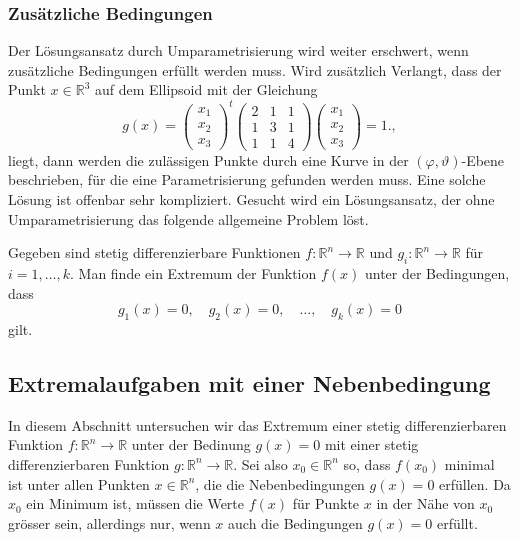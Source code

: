 %
%
\subsubsection{Zusätzliche Bedingungen}
Der Lösungsansatz durch Umparametrisierung wird weiter erschwert,
wenn zusätzliche Bedingungen erfüllt werden muss.
Wird zusätzlich Verlangt, dass der Punkt $x\in\mathbb{R}^3$ auf
dem Ellipsoid mit der Gleichung
\begin{equation}
g(x)
=
\begin{pmatrix}
x_1\\x_2\\x_3
\end{pmatrix}^t
\begin{pmatrix}
2&1&1\\
1&3&1\\
1&1&4
\end{pmatrix}
\begin{pmatrix}
x_1\\x_2\\x_3
\end{pmatrix}
=
1.
\label{buch:fuvar:nebenbedingungen:eqn:beispielg},
\end{equation}
liegt, dann werden die zulässigen Punkte durch eine Kurve in der
$(\varphi,\vartheta)$-Ebene beschrieben, für die eine Parametrisierung
gefunden werden muss.
Eine solche Lösung ist offenbar sehr kompliziert.
Gesucht wird ein Lösungsansatz, der ohne Umparametrisierung das folgende
allgemeine Problem löst.

\begin{aufgabe}
\label{buch:fuvar:nebenbedingungen:aufgabe:grund}
Gegeben sind stetig differenzierbare Funktionen
$f\colon\mathbb{R}^n\to\mathbb{R}$ und
$g_i\colon\mathbb{R}^n\to\mathbb{R}$ für $i=1,\dots,k$.
Man finde ein Extremum der Funktion $f(x)$ unter der Bedingungen,
dass
\[
g_1(x) = 0,\quad g_2(x)=0,\quad\dots,\quad g_k(x)=0
\]
gilt.
\end{aufgabe}

%
%
\subsection{Extremalaufgaben mit einer Nebenbedingung}
In diesem Abschnitt untersuchen wir das Extremum einer stetig
differenzierbaren Funktion $f\colon\mathbb{R}^n\to\mathbb{R}$
unter der Bedinung $g(x)=0$ mit einer stetig differenzierbaren
Funktion $g\colon\mathbb{R}^n\to\mathbb{R}$.
Sei also $x_0\in\mathbb{R}^n$ so, dass $f(x_0)$ minimal ist unter
allen Punkten $x\in \mathbb{R}^n$, die die Nebenbedingungen $g(x)=0$
erfüllen.
Da $x_0$ ein Minimum ist, müssen die Werte $f(x)$ für Punkte $x$
in der Nähe von $x_0$ grösser sein, allerdings nur, wenn $x$ auch
die Bedingungen $g(x)=0$ erfüllt.

